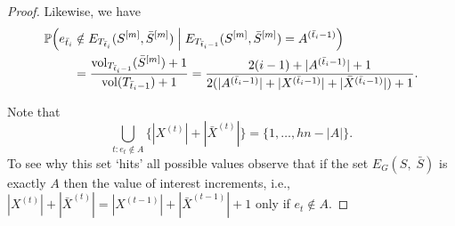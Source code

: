 \documentclass[runningheads, envcountsame, smallextended]{llncs}
\newcommand{\vol}{{\rm vol}}
\newcommand{\pr}{{\mathbb P}}
\numberwithin{theorem}{section}
\numberwithin{definition}{section}
\numberwithin{lemma}{section}
\numberwithin{corollary}{section}
\numberwithin{proposition}{section}
\numberwithin{conjecture}{section}
\numberwithin{remark}{section}
\numberwithin{equation}{section}
\begin{document}
\begin{proof}
	Likewise, we have
%    	
    \begin{equation} \label{ineq:Sbar}
		\begin{split}
			\pr\Big( e_{\bar{t}_i} & \notin E_{T_{\bar{t}_i}}(S^{[m]}, \bar{S}^{[m]}) \;  \Big| \; E_{T_{\bar{t}_i-1}}(S^{[m]}, \bar{S}^{[m]})		 = A^{(\bar{t}_i-1)}\Big) \\&
			= \frac{\vol_{T_{\bar{t}_i-1}}(\bar{S}^{[m]})+1}{\vol(T_{\bar{t}_i-1})+1} = \frac{2(i-1)+|A^{(\bar{t}_i-1)}|+1}{2(|A^{(\bar{t}_i-1)}|+|X^{(\bar{t}_i-1)}|+|\bar{X}^{(\bar{t}_i-1)}|)+1}.
		\end{split}
	\end{equation}
	
	
	Note that 
	\begin{equation} \label{eq:hitsAll}
		\bigcup_{t: e_t \notin A} \{ |X^{(t)}|+|\bar{X}^{(t)}|\} = \{1, \ldots, hn-|A|\}.
	\end{equation}
	To see why this set `hits' all possible values observe that if the set $E_{G}(S, \; \bar{S})$ is exactly $A$ then the value of interest increments, i.e.,  $|X^{(t)}|+|\bar{X}^{(t)}|=|X^{(t-1)}|+|\bar{X}^{(t-1)}|+1$ only if $e_t \notin A$.
	

\end{proof}
\end{document}
